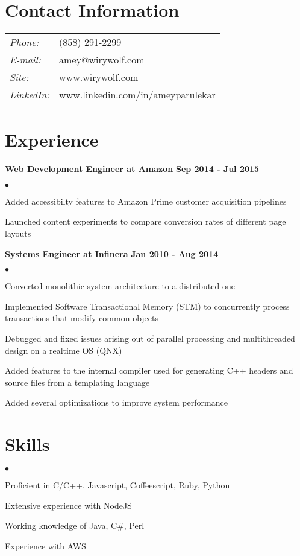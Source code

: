 \documentclass[margin,line]{res}
\newenvironment{list2}{
  \begin{list}{$\bullet$}{%
      \setlength{\itemsep}{0in}
      \setlength{\parsep}{0in} \setlength{\parskip}{0in}
      \setlength{\topsep}{0in} \setlength{\partopsep}{0in}
      \setlength{\leftmargin}{0.2in}}}{\end{list}}
\begin{document}

\begin{resume}
\section{\sc Contact Information}
\vspace{.05in}
\begin{tabular}{l l}
{\it Phone:} & (858) 291-2299 \\
{\it E-mail:} & amey@wirywolf.com \\
{\it Site:} & www.wirywolf.com \\
{\it LinkedIn:} & www.linkedin.com/in/ameyparulekar \\
\end{tabular}

\section{\sc Experience}

{\bf Web Development Engineer at Amazon} \hfill {\bf Sep 2014 - Jul 2015}\\
\begin{list2}
\item Added accessibilty features to Amazon Prime customer acquisition pipelines
\item Launched content experiments to compare conversion rates of different page layouts
\end{list2}

{\bf Systems Engineer at Infinera} \hfill {\bf Jan 2010 - Aug 2014}\\
\begin{list2}
\item Converted monolithic system architecture to a distributed one
\item Implemented Software Transactional Memory (STM) to concurrently process transactions that modify common objects
\item Debugged and fixed issues arising out of parallel processing and multithreaded design on a realtime OS (QNX)
\item Added features to the internal compiler used for generating C++ headers and source files from a templating language
\item Added several optimizations to improve system performance
\end{list2}

\section{\sc Skills}
\begin{list2}
\item Proficient in C/C++, Javascript, Coffeescript, Ruby, Python
\item Extensive experience with NodeJS
\item Working knowledge of Java, C\#, Perl
\item Experience with AWS
\end{list2}


\end{resume}
\end{document}
